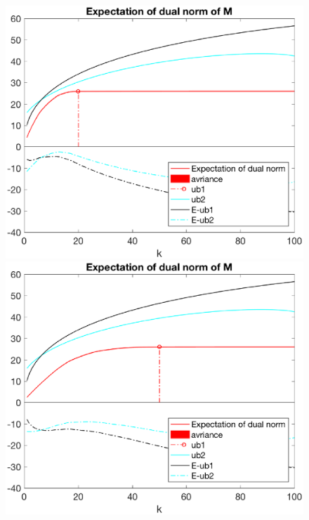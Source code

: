 \documentclass[12pt]{article}
\begin{document}
\begin{figure}[h]
    \begin{minipage}[c]{.4\linewidth}
        \centering
        \includegraphics[width=\linewidth]{Fig/dualnorm-u0rand-k0-20-minusnoise.eps}
    \end{minipage}
    \hfill%
    \begin{minipage}[c]{.4\linewidth}
        \centering
        \includegraphics[width=\linewidth]{Fig/dualnorm-u0rand-k0-50-minusnoise.eps}
    \end{minipage}
\end{figure}
\end{document}

